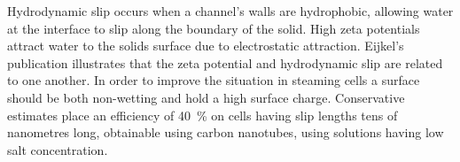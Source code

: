     Hydrodynamic slip occurs when a channel's walls are hydrophobic, allowing water at the interface to slip along the boundary of the solid.
    High zeta potentials attract water to the solids surface due to electrostatic attraction.
    Eijkel's publication illustrates that the zeta potential and hydrodynamic slip are related to one another.
    In order to improve the situation in steaming cells a surface should be both non-wetting and hold a high surface charge.
    Conservative estimates place an efficiency of \SI{40}{\percent} on cells having slip lengths tens of nanometres long, obtainable using carbon nanotubes, using solutions having low salt concentration.








